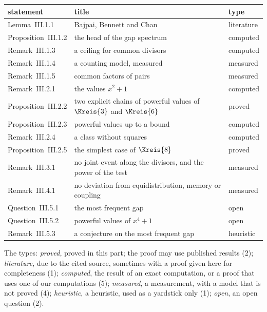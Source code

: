 \begingroup\small
\begin{longtable}{l p{7.2cm} l}
\hline
statement & title & type \\
\hline
\endhead
Lemma~III.1.1 & Bajpai, Bennett and Chan {\cite[proof of Theorem~1.1]{BajpaiBennettChan2024}} & literature \\
Proposition~III.1.2 & the head of the gap spectrum & computed \\
Remark~III.1.3 & a ceiling for common divisors & computed \\
Remark~III.1.4 & a counting model, measured & measured \\
Remark~III.1.5 & common factors of pairs & measured \\
Remark~III.2.1 & the values $x^2 + 1$ & computed \\
Proposition~III.2.2 & two explicit chains of powerful values of $\Kreis{3}$ and $\Kreis{6}$ & proved \\
Proposition~III.2.3 & powerful values up to a bound & computed \\
Remark~III.2.4 & a class without squares & computed \\
Proposition~III.2.5 & the simplest case of $\Kreis{8}$ & proved \\
Remark~III.3.1 & no joint event along the divisors, and the power of the test & measured \\
Remark~III.4.1 & no deviation from equidistribution, memory or coupling & measured \\
Question~III.5.1 & the most frequent gap & open \\
Question~III.5.2 & powerful values of $x^4 + 1$ & open \\
Remark~III.5.3 & a conjecture on the most frequent gap & heuristic \\
\hline
\end{longtable}
\endgroup

The types: \emph{proved}, proved in this part; the proof may use published results (2); \emph{literature}, due to the cited source, sometimes with a proof given here for completeness (1); \emph{computed}, the result of an exact computation, or a proof that uses one of our computations (5); \emph{measured}, a measurement, with a model that is not proved (4); \emph{heuristic}, a heuristic, used as a yardstick only (1); \emph{open}, an open question (2).
